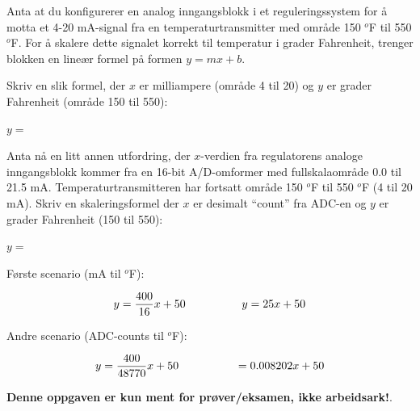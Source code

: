 

Anta at du konfigurerer en analog inngangsblokk i et reguleringssystem for å motta et 4-20 mA-signal fra en temperaturtransmitter med område 150 $^{o}$F til 550 $^{o}$F. For å skalere dette signalet korrekt til temperatur i grader Fahrenheit, trenger blokken en lineær formel på formen $y = mx + b$.

\vskip 10pt

Skriv en slik formel, der $x$ er milliampere (område 4 til 20) og $y$ er grader Fahrenheit (område 150 til 550):

\vskip 10pt

$y =$

\vskip 20pt

Anta nå en litt annen utfordring, der $x$-verdien fra regulatorens analoge inngangsblokk kommer fra en 16-bit A/D-omformer med fullskalaområde 0.0 til 21.5 mA. Temperaturtransmitteren har fortsatt område 150 $^{o}$F til 550 $^{o}$F (4 til 20 mA). Skriv en skaleringsformel der $x$ er desimalt ``count'' fra ADC-en og $y$ er grader Fahrenheit (150 til 550):

\vskip 10pt

$y =$







Første scenario (mA til $^{o}$F):

$$y = {400 \over 16}x + 50 \hskip 50pt y = 25x + 50$$

\vskip 10pt

Andre scenario (ADC-counts til $^{o}$F):

$$y = {400 \over 48770}x + 50 \hskip 50pt = 0.008202x + 50$$







{\bf Denne oppgaven er kun ment for prøver/eksamen, ikke arbeidsark!}.


